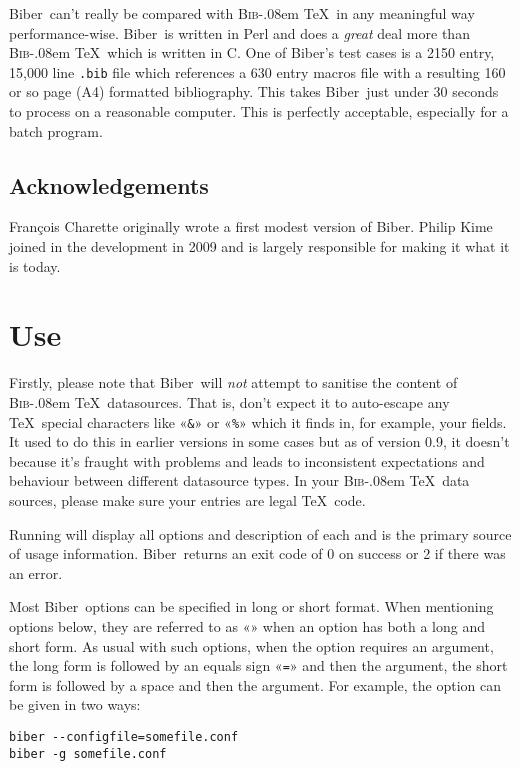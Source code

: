 \documentclass{ltxdockit}
\def\BibTeX{\textsc{Bib}\kern-.08em \TeX}
\newcommand*{\biber}{Biber\xspace}
\begin{document}
\biber\ can't really be compared with \BibTeX\ in any meaningful
way performance-wise. \biber\ is written in Perl and does a
\emph{great} deal more than \BibTeX\ which is written in C. One of
\biber's test cases is a 2150 entry, 15,000 line \verb+.bib+ file
which references a 630 entry macros file with a resulting 160 or so page (A4)
formatted bibliography. This takes \biber\ just under 30 seconds to process on
a reasonable computer. This is perfectly acceptable, especially for a
batch program.

\subsection{Acknowledgements}

François Charette originally wrote a first modest version of \biber. Philip Kime joined in
the development in 2009 and is largely responsible for making it what it is today. 

\section{Use}

Firstly, please note that \biber\ will \emph{not} attempt to sanitise
the content of \BibTeX\ datasources. That is, don't expect it to
auto-escape any \TeX\ special characters like «\verb+&+» or «\verb+%+» which
it finds in, for example, your  fields. It used to do this in
earlier versions in some cases but as of version 0.9, it doesn't because
it's fraught with problems and leads to inconsistent expectations and
behaviour between different datasource types. In your \BibTeX\ data
sources, please make sure your entries are legal \TeX\ code.

Running  will display all options and description of
each and is the primary source of usage information. \biber\
returns an exit code of 0 on success or 2 if there was an error.

Most \biber\ options can be specified in long or short format. When
mentioning options below, they are referred to as
«» when an option has both a long and short
form. As usual with such options, when the option requires an argument, the
long form is followed by an equals sign «\verb+=+» and then the argument,
the short form is followed by a space and then the argument. For example,
the \opt{--configfile|-g} option can be given in two ways:

\begin{verbatim}
biber --configfile=somefile.conf
biber -g somefile.conf
\end{verbatim}
\end{document}
